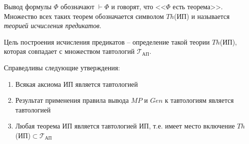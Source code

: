 \begin{definition}
    Вывод формулы $\Phi$ обозначают $\vdash\Phi$ и говорят, что <<$\Phi$ есть теорема>>. Множество всех таких теорем обозначается символом $Th$(ИП) и называется \textit{теорией исчисления предикатов}.

    Цель построения исчисления предикатов -- определение такой теории $Th$(ИП), которая совпадает с множеством тавтологий $\mathscr{T}_{\text{АП}}$. 
\end{definition}

\begin{lemma}
    Справедливы следующие утверждения:
    \begin{enumerate}
        \item Всякая аксиома ИП является тавтологией
        \item Результат применения правила вывода $MP$ и $Gen$ к тавтологиям является тавтологией
        \item Любая теорема ИП является тавтологией ИП, т.е. имеет место включение $Th$(ИП)$\subset\mathscr{T}_{\text{АП}}$
    \end{enumerate}
\end{lemma}